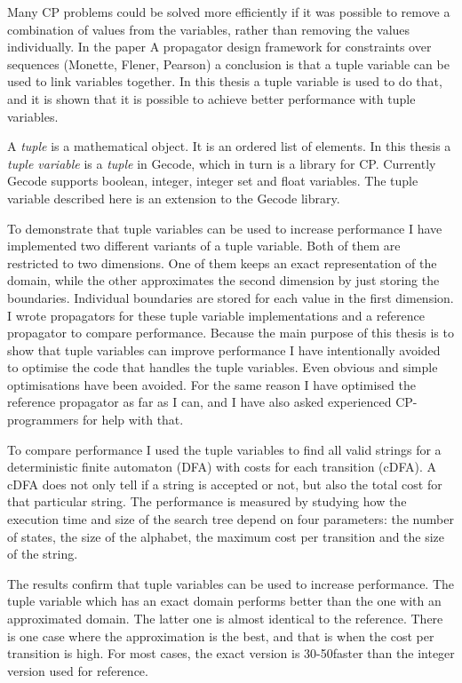 \documentclass[a4paper,11pt]{article}
\begin{document}
Many CP problems could be solved more efficiently if it was possible to remove a combination of values from the variables, rather than removing the values individually. In the paper A propagator design framework for constraints over sequences (Monette, Flener, Pearson) a conclusion is that a tuple variable can be used to link variables together. In this thesis a tuple variable is used to do that, and it is shown that it is possible to achieve better performance with tuple variables. 

A \textit{tuple} is a mathematical object. It is an ordered list of elements. In this thesis a \textit{tuple variable} is a \textit{tuple} in Gecode, which in turn is a library for CP. Currently Gecode supports boolean, integer, integer set and float variables. The tuple variable described here is an extension to the Gecode library.

To demonstrate that tuple variables can be used to increase performance I have implemented two different variants of a tuple variable. Both of them are restricted to two dimensions. One of them keeps an exact representation of the domain, while the other approximates the second dimension by just storing the boundaries. Individual boundaries are stored for each value in the first dimension. I wrote propagators for these tuple variable implementations and a reference propagator to compare performance. Because the main purpose of this thesis is to show that tuple variables can improve performance I have intentionally avoided to optimise the code that handles the tuple variables. Even obvious and simple optimisations have been avoided. For the same reason I have optimised the reference propagator as far as I can, and I have also asked experienced CP-programmers for help with that.

To compare performance I used the tuple variables to find all valid strings for a deterministic finite automaton (DFA) with costs for each transition (cDFA). A cDFA does not only tell if a string is accepted or not, but also the total cost for that particular string. The performance is measured by studying how the execution time and size of the search tree depend on four parameters: the number of states, the size of the alphabet, the maximum cost per transition and the size of the string.

The results confirm that tuple variables can be used to increase performance. The tuple variable which has an exact domain performs better than the one with an approximated domain. The latter one is almost identical to the reference. There is one case where the approximation is the best, and that is when the cost per transition is high. For most cases, the exact version is 30-50\percent faster than the integer version used for reference.
\end{document}
